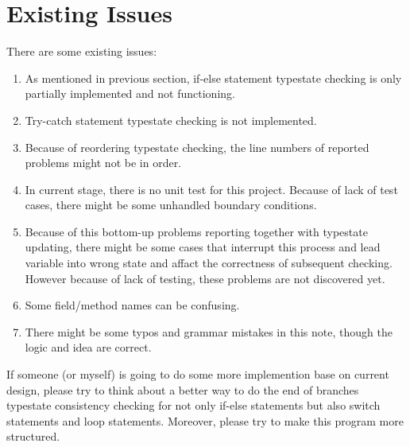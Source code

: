 \documentclass[]{article}
\begin{document}
\section{Existing Issues}
There are some existing issues:
\begin{enumerate}
	\item As mentioned in previous section, if-else statement typestate checking is only partially implemented and not functioning.
	\item Try-catch statement typestate checking is not implemented.
	\item Because of reordering typestate checking, the line numbers of reported problems might not be in order.
	\item In current stage, there is no unit test for this project. Because of lack of test cases, there might be some unhandled boundary conditions. 
	\item Because of this bottom-up problems reporting together with typestate updating, there might be some cases that interrupt this process and lead variable into wrong state and affact the correctness of subsequent checking. However because of lack of testing, these problems are not discovered yet.
	\item Some field/method names can be confusing.
	\item There might be some typos and grammar mistakes in this note, though the logic and idea are correct.
\end{enumerate}
If someone (or myself) is going to do some more implemention base on current design, please try to think about a better way to do the end of branches typestate consistency checking for not only if-else statements but also switch statements and loop statements. Moreover, please try to make this program more structured. \\[0.2cm]



%
\end{document}
